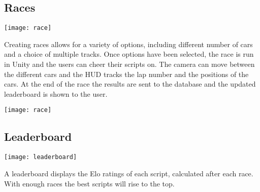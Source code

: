 \subsection{Races}
\centerline{\texttt{[image: race]}}
Creating races allows for a variety of options, including different number of cars and a choice of multiple tracks. Once options have been selected, the race is run in Unity and the users can cheer their scripts on. The camera can move between the different cars and the HUD tracks the lap number and the positions of the cars. At the end of the race the results are sent to the database and the updated leaderboard is shown to the user.

\centerline{\texttt{[image: race]}}

\subsection{Leaderboard}
\centerline{\texttt{[image: leaderboard]}}
A leaderboard displays the Elo ratings of each script, calculated after each race. With enough races the best scripts will rise to the top.
